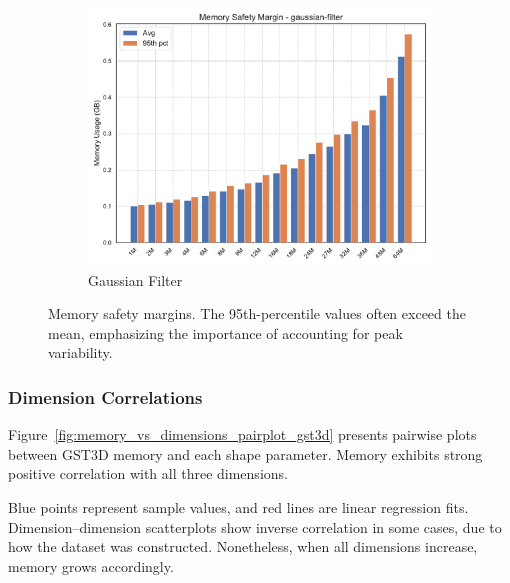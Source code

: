 \begin{figure}[htbp]
\begin{subfigure}[t]{0.32\textwidth}
        \includegraphics[width=\textwidth]{assets/images/05/memory_safety_margin_gaussian-filter}
        \caption{Gaussian Filter}
    \end{subfigure}
    \caption{Memory safety margins. The 95th-percentile values often exceed the mean, emphasizing the importance of accounting for peak variability.}
    \label{fig:memory_safety_margin}
\end{figure}

\subsubsection{Dimension Correlations}
\label{subsec:dimension-correlations}

Figure~\ref{fig:memory_vs_dimensions_pairplot_gst3d} presents pairwise plots between \ac{GST3D} memory and each shape parameter.
Memory exhibits strong positive correlation with all three dimensions.

Blue points represent sample values, and red lines are linear regression fits.
Dimension--dimension scatterplots show inverse correlation in some cases, due to how the dataset was constructed.
Nonetheless, when all dimensions increase, memory grows accordingly.

